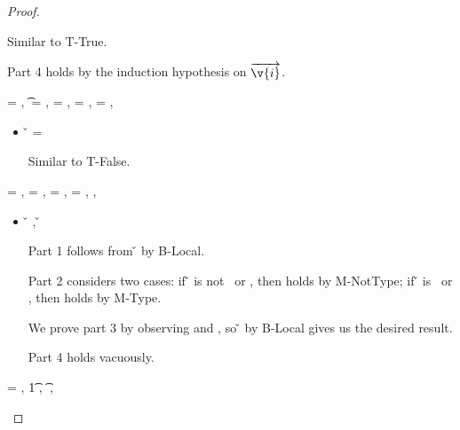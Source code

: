 \begin{lemma}
\begin{proof}
\begin{case}[T-Instance]
\begin{itemize}
\begin{subcase}[B-Val]
        Similar to T-True.

        Part 4 holds by the induction hypothesis on ${\overrightarrow{\v{i}}}$.
      \end{subcase}
  \end{itemize}
\end{case}


\begin{case}[T-Nil]
\e{} = \nil, \t{} = \Nil, \thenprop{\prop{}} = \botprop{}, \elseprop{\prop{}} = \topprop{}, \object{} = \emptyobject{},

\begin{itemize}
  \item[] 
    \begin{subcase}[B-Val] 
      \v{} = \nil{}

      Similar to T-False.
\end{subcase}

\end{itemize}

\end{case}

\begin{case}[T-Local]
  \e{} = \x{}, \thenprop{\prop{}} = {\notprop {\falsy{}} {\x{}}},
  \elseprop{\prop{}} = {\isprop {\falsy{}} {\x{}}},
\object{} = \x{}, 
\inpropenv{\propenv{}}{\isprop{\t{}}{\x{}}},

\begin{itemize}
  \item[]
\begin{subcase}[B-Local]
{ \inopenv {\openv{}} {\x{}} {\v{}} },
{ \opsem {\openv{}} {\x{}} {\v{}} }

Part 1 follows from \inopenv{\openv{}}{\x{}} {\v{}} by B-Local.

Part 2 considers two cases: if \v{} is not \false\ or \nil, then 
\satisfies{\openv{}}{\notprop{\falsy}{\x{}}} holds by M-NotType; if \v{} is \false\ or \nil, then 
\satisfies{\openv{}}{\isprop{\falsy}{\x{}}} holds by M-Type.

We prove part 3 by observing
\inpropenv{\propenv{}}{\isprop{\t{}}{\x{}}}
and
\satisfies{\openv{}}{\propenv{}},
so
{ \inopenv {\openv{}} {\x{}} {\v{}} }
by B-Local
gives us the desired result.

Part 4 holds vacuously.
\end{subcase}
\end{itemize}

\end{case}

\begin{case}[T-Do]
\e{} = { {}},
  \judgement {\propenv{}} 
             {} {\t1}
             { {}} 
             {},
           {} {\t{}}
           {\filterset {\thenprop {\prop{}}} {\elseprop {\prop{}}}} 
           {\object{}},


\end{case}
\end{proof}
\end{lemma}
